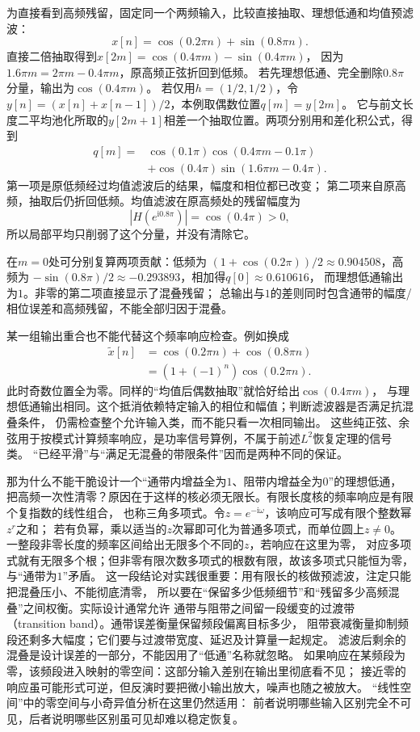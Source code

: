 为直接看到高频残留，固定同一个两频输入，比较直接抽取、理想低通和均值预滤波：
\[
  x[n]=\cos(0.2\pi n)+\sin(0.8\pi n).
\]
直接二倍抽取得到$x[2m]=\cos(0.4\pi m)-\sin(0.4\pi m)$，
因为$1.6\pi m=2\pi m-0.4\pi m$，原高频正弦折回到低频。
若先理想低通、完全删除$0.8\pi$分量，输出为$\cos(0.4\pi m)$。
若仅用$h=(1/2,1/2)$，令$y[n]=(x[n]+x[n-1])/2$，本例取偶数位置$q[m]=y[2m]$。
它与前文长度二平均池化所取的$y[2m+1]$相差一个抽取位置。两项分别用和差化积公式，得到
\[
 \begin{aligned}
  q[m]={}&\cos(0.1\pi)\cos(0.4\pi m-0.1\pi)\\
        &+\cos(0.4\pi)\sin(1.6\pi m-0.4\pi).
 \end{aligned}
\]
第一项是原低频经过均值滤波后的结果，幅度和相位都已改变；
第二项来自原高频，抽取后仍折回低频。均值滤波在原高频处的残留幅度为
\[
  |H(e^{\mathrm i0.8\pi})|=\cos(0.4\pi)>0,
\]
所以局部平均只削弱了这个分量，并没有清除它。

在$m=0$处可分别复算两项贡献：低频为
$(1+\cos(0.2\pi))/2\approx0.904508$，高频为
$-\sin(0.8\pi)/2\approx-0.293893$，相加得$q[0]\approx0.610616$，
而理想低通输出为$1$。非零的第二项直接显示了混叠残留；
总输出与$1$的差则同时包含通带的幅度/相位误差和高频残留，不能全部归因于混叠。

某一组输出重合也不能代替这个频率响应检查。例如换成
\[
 \begin{aligned}
  \widetilde x[n]&=\cos(0.2\pi n)+\cos(0.8\pi n)\\
                 &=(1+(-1)^n)\cos(0.2\pi n).
 \end{aligned}
\]
此时奇数位置全为零。同样的“均值后偶数抽取”就恰好给出$\cos(0.4\pi m)$，
与理想低通输出相同。这个抵消依赖特定输入的相位和幅值；判断滤波器是否满足抗混叠条件，
仍需检查整个允许输入类，而不能只看一次相同输出。
这些纯正弦、余弦用于按模式计算频率响应，是功率信号算例，不属于前述$L^2$恢复定理的信号类。
“已经平滑”与“满足无混叠的带限条件”因而是两种不同的保证。

那为什么不能干脆设计一个“通带内增益全为$1$、阻带内增益全为$0$”的理想低通，
把高频一次性清零？原因在于这样的核必须无限长。有限长度核的频率响应是有限个复指数的线性组合，
也称三角多项式。令$z=e^{-\mathrm i\omega}$，该响应可写成有限个整数幂$z^r$之和；
若有负幂，乘以适当的$z$次幂即可化为普通多项式，而单位圆上$z\neq0$。
一整段非零长度的频率区间给出无限多个不同的$z$，若响应在这里为零，
对应多项式就有无限多个根；但非零有限次数多项式的根数有限，故该多项式只能恒为零，
与“通带为$1$”矛盾。
这一段结论对实践很重要：用有限长的核做预滤波，注定只能把混叠压小、不能彻底清零，
所以要在“保留多少低频细节”和“残留多少高频混叠”之间权衡。实际设计通常允许
通带与阻带之间留一段缓变的过渡带（transition band）。通带误差衡量保留频段偏离目标多少，
阻带衰减衡量抑制频段还剩多大幅度；它们要与过渡带宽度、延迟及计算量一起规定。
滤波后剩余的混叠是设计误差的一部分，不能因用了“低通”名称就忽略。
如果响应在某频段为零，该频段进入映射的零空间：这部分输入差别在输出里彻底看不见；
接近零的响应虽可能形式可逆，但反演时要把微小输出放大，噪声也随之被放大。
“线性空间”中的零空间与小奇异值分析在这里仍然适用：
前者说明哪些输入区别完全不可见，后者说明哪些区别虽可见却难以稳定恢复。

